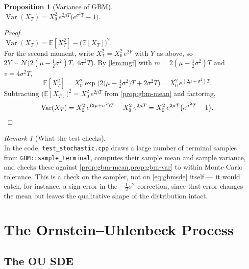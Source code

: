 \documentclass[11pt]{report}
\newcommand{\E}{\mathbb{E}}
\newcommand{\Var}{\operatorname{Var}}
\theoremstyle{plain}
\newtheorem{proposition}{Proposition}[chapter]
\theoremstyle{definition}
\theoremstyle{remark}
\newtheorem{remark}{Remark}[chapter]
\numberwithin{equation}{chapter}
\begin{document}
\begin{proposition}[Variance of GBM]\label{prop:gbm-var}
\leavevmode\\

$\Var(X_T) = X_0^2\,e^{2\mu T}\big(e^{\sigma^2 T}-1\big)$.
\end{proposition}
\medskip
\begin{proof}
\leavevmode\\
$\Var(X_T)=\E[X_T^2]-\big(\E[X_T]\big)^2$.
\\For the second moment, write
$X_T^2=X_0^2\,e^{2Y}$ with $Y$ as above, so $2Y\sim\mathcal
N\big(2(\mu-\tfrac12\sigma^2)T,\ 4\sigma^2 T\big)$. By \cref{lem:mgf}
with $m=2(\mu-\tfrac12\sigma^2)T$ and $v=4\sigma^2 T$,
\[
   \E[X_T^2] = X_0^2\exp\!\Big( 2\big(\mu-\tfrac12\sigma^2\big)T + 2\sigma^2 T \Big)
             = X_0^2\,e^{(2\mu+\sigma^2)T}.
\]
Subtracting $\big(\E[X_T]\big)^2=X_0^2\,e^{2\mu T}$ from
\cref{prop:gbm-mean} and factoring,
\[
   \Var(X_T) = X_0^2\,e^{(2\mu+\sigma^2)T} - X_0^2\,e^{2\mu T}
             = X_0^2\,e^{2\mu T}\big(e^{\sigma^2 T}-1\big). \qedhere
\]
\end{proof}

\begin{remark}[What the test checks]
  \leavevmode\\
In the code, \texttt{test\_stochastic.cpp} draws a large number of terminal samples
from \texttt{GBM::sample\_terminal}, computes their sample mean and
sample variance, and checks these against
\cref{prop:gbm-mean,prop:gbm-var} to within Monte Carlo tolerance. This
is a check on the sampler, not on \eqref{eq:gbmsde} itself ---
it would catch, for instance, a sign error in the $-\tfrac12\sigma^2$
correction, since that error changes the mean but leaves the
qualitative shape of the distribution intact.
\end{remark}

\chapter{The Ornstein--Uhlenbeck Process}

\section{The OU SDE}
\end{document}
